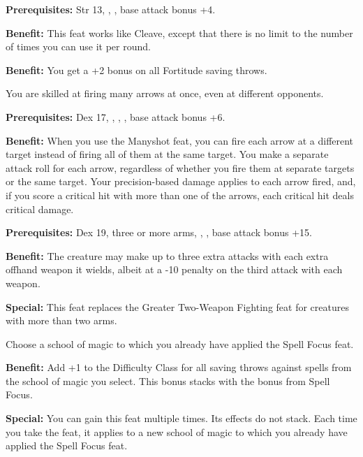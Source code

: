 \textbf{Prerequisites:} Str 13, , , base attack bonus +4.

\textbf{Benefit:} This feat works like Cleave, except that there is no limit to 
the number of times you can use it per round.


\textbf{Benefit:} You get a +2 bonus on all Fortitude saving throws.


You are skilled at firing many arrows at once, even at different opponents.

\textbf{Prerequisites:} Dex 17, , , , base attack 
bonus +6.

\textbf{Benefit:} When you use the Manyshot feat, you can fire each arrow at a 
different target instead of firing all of them at the same target. You make a separate 
attack roll for each arrow, regardless of whether you fire them at separate targets 
or the same target. Your precision-based damage applies to each arrow fired, and, 
if you score a critical hit with more than one of the arrows, each critical hit 
deals critical damage.


\textbf{Prerequisites:} Dex 19, three or more arms, , 
, base attack bonus +15.

\textbf{Benefit:} The creature may make up to three extra attacks with each extra 
offhand weapon it wields, albeit at a -10 penalty on the third attack with each 
weapon.

\textbf{Special:} This feat replaces the Greater Two-Weapon Fighting feat for creatures 
with more than two arms.


Choose a school of magic to which you already have applied the Spell Focus feat.

\textbf{Benefit:} Add +1 to the Difficulty Class for all saving throws against 
spells from the school of magic you select. This bonus stacks with the bonus from 
Spell Focus.

\textbf{Special:} You can gain this feat multiple times. Its effects do not stack. 
Each time you take the feat, it applies to a new school of magic to which you already 
have applied the Spell Focus feat.

